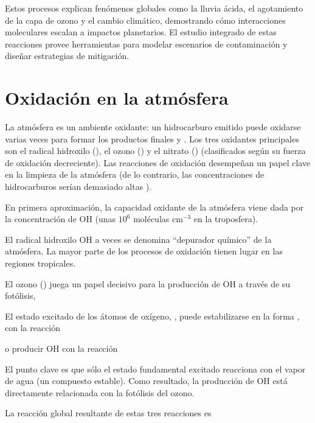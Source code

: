 Estos procesos explican fenómenos globales como la lluvia ácida, el agotamiento de la capa de ozono y el cambio climático, demostrando cómo interacciones moleculares escalan a impactos planetarios. El estudio integrado de estas reacciones provee herramientas para modelar escenarios de contaminación y diseñar estrategias de mitigación.

\section{Oxidación en la atmósfera}
\label{7quim}

La atmósfera es un ambiente oxidante: un hidrocarburo emitido puede oxidarse varias veces para formar los productos finales  y . Los tres oxidantes principales son el radical hidroxilo (), el ozono () y el nitrato () (clasificados según su fuerza de oxidación decreciente).  Las reacciones de oxidación desempeñan un papel clave en la limpieza de la atmósfera (de lo contrario, las concentraciones de hidrocarburos serían demasiado altas ).

En primera aproximación, la capacidad oxidante de la atmósfera viene dada por la concentración de OH (unas $10^6$ moléculas cm${^{-3}}$ en la troposfera).

El radical hidroxilo OH a veces se denomina “depurador químico” de la atmósfera. La mayor parte de los procesos de oxidación tienen lugar en las regiones tropicales.

El ozono ()  juega un papel decisivo para la producción de OH a través de su fotólisis,


El estado excitado de los átomos de oxígeno, , puede estabilizarse en la forma , con la reacción


o producir OH con la reacción

El punto clave es que sólo el estado fundamental excitado  reacciona con el vapor de agua (un compuesto estable). Como resultado, la producción de OH está directamente relacionada con la fotólisis del ozono.

La reacción global resultante de estas tres reacciones es

